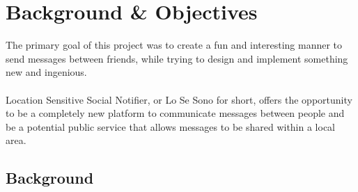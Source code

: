 \chapter{Background \& Objectives}
\label{ch:background}

The primary goal of this project was to create a fun and interesting manner to send messages between friends, while trying to design and implement something new and ingenious.\\
\\
Location Sensitive Social Notifier, or Lo Se Sono for short, offers the opportunity to be a completely new platform to communicate messages between people and be a potential public service that allows messages to be shared within a local area.

\section{Background}   

